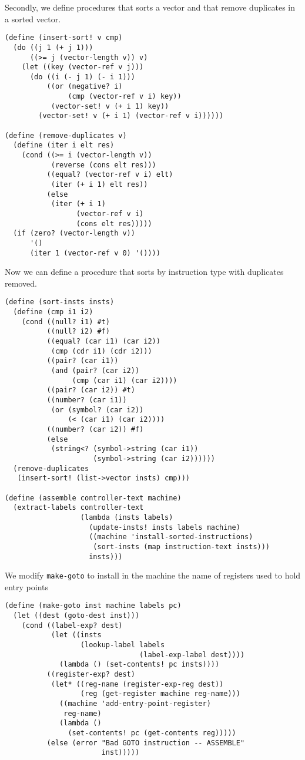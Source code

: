 \documentclass[a4paper,12pt]{article}
\begin{document}
Secondly, we define procedures that sorts a vector and that remove
duplicates in a sorted vector.

\begin{lstlisting}
(define (insert-sort! v cmp)
  (do ((j 1 (+ j 1)))
      ((>= j (vector-length v)) v)
    (let ((key (vector-ref v j)))
      (do ((i (- j 1) (- i 1)))
          ((or (negative? i)
               (cmp (vector-ref v i) key))
           (vector-set! v (+ i 1) key))
        (vector-set! v (+ i 1) (vector-ref v i))))))

(define (remove-duplicates v)
  (define (iter i elt res)
    (cond ((>= i (vector-length v))
           (reverse (cons elt res)))
          ((equal? (vector-ref v i) elt)
           (iter (+ i 1) elt res))
          (else
           (iter (+ i 1)
                 (vector-ref v i)
                 (cons elt res)))))
  (if (zero? (vector-length v))
      '()
      (iter 1 (vector-ref v 0) '())))
\end{lstlisting}

Now we can define a procedure that sorts by instruction type with
duplicates removed.

\begin{lstlisting}
(define (sort-insts insts)
  (define (cmp i1 i2)
    (cond ((null? i1) #t)
          ((null? i2) #f)
          ((equal? (car i1) (car i2))
           (cmp (cdr i1) (cdr i2)))
          ((pair? (car i1))
           (and (pair? (car i2))
                (cmp (car i1) (car i2))))
          ((pair? (car i2)) #t)
          ((number? (car i1))
           (or (symbol? (car i2))
               (< (car i1) (car i2))))
          ((number? (car i2)) #f)
          (else
           (string<? (symbol->string (car i1))
                     (symbol->string (car i2))))))
  (remove-duplicates
   (insert-sort! (list->vector insts) cmp)))

(define (assemble controller-text machine)
  (extract-labels controller-text
                  (lambda (insts labels)
                    (update-insts! insts labels machine)
                    ((machine 'install-sorted-instructions)
                     (sort-insts (map instruction-text insts)))
                    insts)))
\end{lstlisting}

We modify \lstinline!make-goto! to install in the machine the name of
registers used to hold entry points

\begin{lstlisting}
(define (make-goto inst machine labels pc)
  (let ((dest (goto-dest inst)))
    (cond ((label-exp? dest)
           (let ((insts
                  (lookup-label labels
                                (label-exp-label dest))))
             (lambda () (set-contents! pc insts))))
          ((register-exp? dest)
           (let* ((reg-name (register-exp-reg dest))
                  (reg (get-register machine reg-name)))
             ((machine 'add-entry-point-register)
              reg-name)
             (lambda ()
               (set-contents! pc (get-contents reg)))))
          (else (error "Bad GOTO instruction -- ASSEMBLE"
                       inst)))))
\end{lstlisting}
\end{document}
